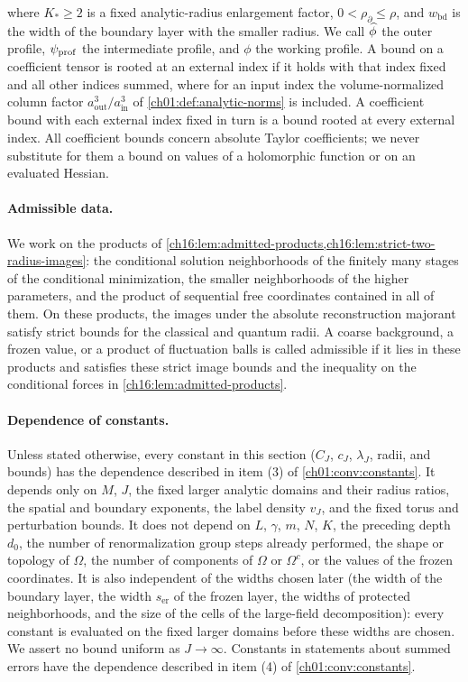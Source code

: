 where $K_*\ge2$ is a fixed analytic-radius enlargement factor, $0<\rho_\partial\le\rho$, and $w_{\mathrm{bd}}$ is the width of the boundary layer with the smaller radius. We call $\widehat\phi$ the outer profile, $\psi_{\mathrm{prof}}$ the intermediate profile, and $\phi$ the working profile. A bound on a coefficient tensor is rooted at an external index if it holds with that index fixed and all other indices summed, where for an input index the volume-normalized column factor $a_{\mathrm{out}}^3/a_{\mathrm{in}}^3$ of \cref{ch01:def:analytic-norms} is included. A coefficient bound with each external index fixed in turn is a bound rooted at every external index. All coefficient bounds concern absolute Taylor coefficients; we never substitute for them a bound on values of a holomorphic function or on an evaluated Hessian.

\paragraph{Admissible data.}
We work on the products of \cref{ch16:lem:admitted-products,ch16:lem:strict-two-radius-images}: the conditional solution neighborhoods of the finitely many stages of the conditional minimization, the smaller neighborhoods of the higher parameters, and the product of sequential free coordinates contained in all of them. On these products, the images under the absolute reconstruction majorant satisfy strict bounds for the classical and quantum radii. A coarse background, a frozen value, or a product of fluctuation balls is called admissible if it lies in these products and satisfies these strict image bounds and the inequality on the conditional forces in \cref{ch16:lem:admitted-products}.

\paragraph{Dependence of constants.}
Unless stated otherwise, every constant in this section ($C_J$, $c_J$, $\lambda_J$, radii, and bounds) has the dependence described in item (3) of \cref{ch01:conv:constants}. It depends only on $M$, $J$, the fixed larger analytic domains and their radius ratios, the spatial and boundary exponents, the label density $v_J$, and the fixed torus and perturbation bounds. It does not depend on $L$, $\gamma$, $m$, $N$, $K$, the preceding depth $d_0$, the number of renormalization group steps already performed, the shape or topology of $\Omega$, the number of components of $\Omega$ or $\Omega^c$, or the values of the frozen coordinates. It is also independent of the widths chosen later (the width of the boundary layer, the width $s_{\mathrm{er}}$ of the frozen layer, the widths of protected neighborhoods, and the size of the cells of the large-field decomposition): every constant is evaluated on the fixed larger domains before these widths are chosen. We assert no bound uniform as $J\to\infty$. Constants in statements about summed errors have the dependence described in item (4) of \cref{ch01:conv:constants}.

